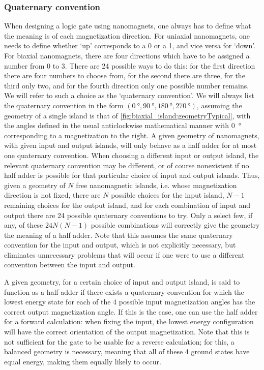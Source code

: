 \documentclass[11pt,a4paper,english]{article}
\begin{document}
\subsubsection{Quaternary convention}
When designing a logic gate using nanomagnets, one always has to define what the meaning is of each magnetization direction. For uniaxial nanomagnets, one needs to define whether `up' corresponds to a 0 or a 1, and vice versa for `down'. For biaxial nanomagnets, there are four directions which have to be assigned a number from 0 to 3. There are 24 possible ways to do this: for the first direction there are four numbers to choose from, for the second there are three, for the third only two, and for the fourth direction only one possible number remains. We will refer to such a choice as the `quaternary convention'. We will always list the quaternary convention in the form $(\SI{0}{\degree}, \SI{90}{\degree}, \SI{180}{\degree}, \SI{270}{\degree})$, assuming the geometry of a single island is that of \cref{fig:biaxial_island:geometryTypical}, with the angles defined in the usual anticlockwise mathematical manner with \SI{0}{\degree} corresponding to a magnetization to the right. A given geometry of nanomagnets, with given input and output islands, will only behave as a half adder for at most one quaternary convention. When choosing a different input or output island, the relevant quaternary convention may be different, or of course nonexistent if no half adder is possible for that particular choice of input and output islands. Thus, given a geometry of $N$ free nanomagnetic islands, i.e. whose magnetization direction is not fixed, there are $N$ possible choices for the input island, $N-1$ remaining choices for the output island, and for each combination of input and output there are 24 possible quaternary conventions to try. Only a select few, if any, of these $24N(N-1)$ possible combinations will correctly give the geometry the meaning of a half adder. Note that this assumes the same quaternary convention for the input and output, which is not explicitly necessary, but eliminates unnecessary problems that will occur if one were to use a different convention between the input and output. \par
A given geometry, for a certain choice of input and output island, is said to function as a half adder if there exists a quaternary convention for which the lowest energy state for each of the 4 possible input magnetization angles has the correct output magnetization angle. If this is the case, one can use the half adder for a forward calculation: when fixing the input, the lowest energy configuration will have the correct orientation of the output magnetization. Note that this is not sufficient for the gate to be usable for a reverse calculation; for this, a balanced geometry is necessary, meaning that all of these 4 ground states have equal energy, making them equally likely to occur. \par
\end{document}
